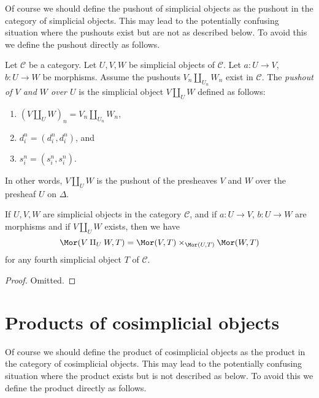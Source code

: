 \noindent
Of course we should define the pushout of simplicial objects
as the pushout in the category of simplicial objects. This
may lead to the potentially confusing situation where the
pushouts exist but are not as described below. To avoid
this we define the pushout directly as follows.

\begin{definition}
\label{definition-push-out}
Let $\mathcal{C}$ be a category.
Let $U, V, W$ be simplicial objects of $\mathcal{C}$.
Let $a : U \to V$, $b : U \to W$ be morphisms.
Assume the pushouts $V_n \amalg_{U_n} W_n$ exist in $\mathcal{C}$.
The {\it pushout of $V$ and $W$ over $U$} is the simplicial object
$V\amalg_U W$ defined as follows:
\begin{enumerate}
\item $(V \amalg_U W)_n = V_n \amalg_{U_n} W_n$,
\item $d^n_i = (d^n_i, d^n_i)$, and
\item $s^n_i = (s^n_i, s^n_i)$.
\end{enumerate}
In other words, $V\amalg_U W$ is the pushout of the presheaves
$V$ and $W$ over the presheaf $U$ on $\Delta$.
\end{definition}

\begin{lemma}
\label{lemma-push-out}
If $U, V, W$ are simplicial objects in the category $\mathcal{C}$,
and if $a : U \to V$, $b : U \to W$ are morphisms
and if $V\amalg_U W$ exists, then we have
$$
\Mor(V\amalg_U W, T) =
\Mor(V, T) \times_{\Mor(U, T)}
\Mor(W, T)
$$
for any fourth simplicial object $T$ of $\mathcal{C}$.
\end{lemma}

\begin{proof}
Omitted.
\end{proof}











\section{Products of cosimplicial objects}
\label{section-products-cosimplicial}

\noindent
Of course we should define the product of cosimplicial objects
as the product in the category of cosimplicial objects. This
may lead to the potentially confusing situation where the product exists
but is not described as below. To avoid this we define the product
directly as follows.

